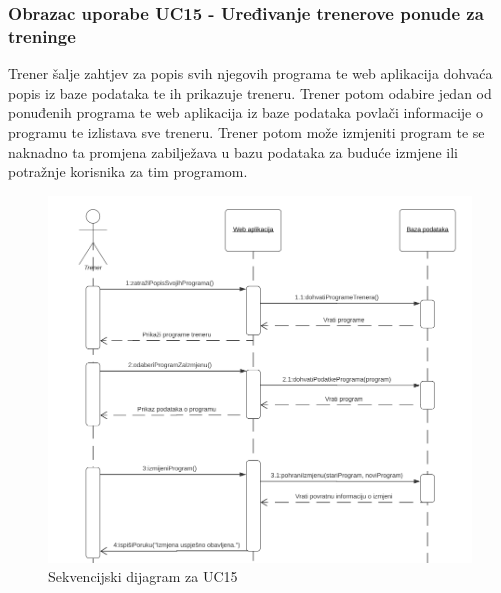                     
                    \subsubsection{Obrazac uporabe UC15 - Uređivanje trenerove ponude za treninge}
					\textit{}Trener šalje zahtjev za popis svih njegovih programa te web aplikacija dohvaća popis
                    iz baze podataka te ih prikazuje treneru. Trener potom odabire jedan od ponuđenih programa
                    te web aplikacija iz baze podataka povlači informacije o programu te izlistava sve treneru.
                    Trener potom može izmjeniti program te se naknadno ta promjena zabilježava u bazu podataka
                    za buduće izmjene ili potražnje korisnika za tim programom.\\
                    
                    \begin{figure}[H]
			            \includegraphics[scale=0.9]{slike/UC15.PNG} %
			            \centering
			            \caption{Sekvencijski dijagram za UC15}
			            \label{fig:promjene}
		            \end{figure}
                    
                    
